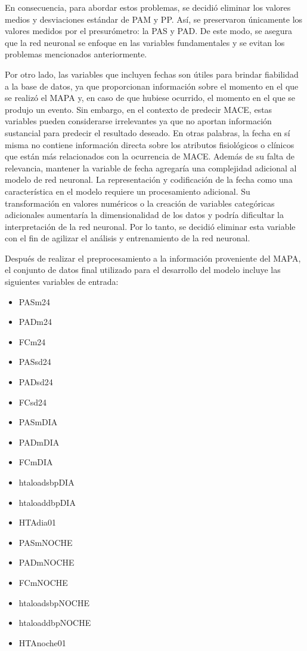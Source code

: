 En consecuencia, para abordar estos problemas, se decidió eliminar los valores medios y desviaciones 
estándar de PAM y PP. Así, se preservaron únicamente los valores medidos por el presurómetro: la PAS y PAD. 
De este modo, se asegura que la red neuronal se enfoque en las variables fundamentales y se evitan 
los problemas mencionados anteriormente.

Por otro lado, las variables que incluyen fechas son útiles para brindar fiabilidad a 
la base de datos, ya que proporcionan información sobre el momento en el que se realizó el MAPA y, en caso 
de que hubiese ocurrido, el momento en el que se produjo un evento.
Sin embargo, en el contexto de predecir MACE, estas variables pueden considerarse irrelevantes ya 
que no aportan información sustancial para predecir el resultado deseado. En otras palabras, 
la fecha en sí misma no contiene información directa sobre los atributos fisiológicos o clínicos 
que están más relacionados con la ocurrencia de MACE. Además de su falta de 
relevancia, mantener la variable de fecha agregaría una complejidad adicional al modelo 
de red neuronal. La representación y codificación de la fecha como una característica en el 
modelo requiere un procesamiento adicional. Su transformación en valores numéricos o la 
creación de variables categóricas adicionales aumentaría la dimensionalidad de los datos 
y podría dificultar la interpretación de la red neuronal. Por lo tanto, se decidió eliminar 
esta variable con el fin de agilizar el análisis y entrenamiento de la red neuronal. 

Después de realizar el preprocesamiento a la información proveniente del MAPA, el conjunto 
de datos final utilizado para el desarrollo del modelo incluye las siguientes variables de entrada:

\begin{itemize}
	\item PASm24	
  \item PADm24
  \item FCm24
  \item PASsd24 
  \item PADsd24
  \item FCsd24
  \item PASmDIA
  \item PADmDIA
  \item FCmDIA
  \item htaloadsbpDIA 
  \item htaloaddbpDIA   
  \item HTAdia01	
  \item PASmNOCHE
  \item PADmNOCHE
  \item FCmNOCHE
  \item htaloadsbpNOCHE
  \item htaloaddbpNOCHE
  \item HTAnoche01
\end{itemize}


